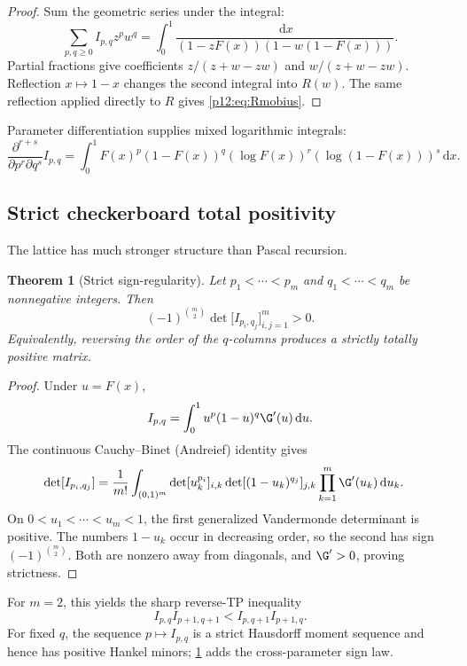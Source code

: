 \documentclass[11pt,oneside]{article}
\newtheorem{theorem}{Theorem}[section]
\theoremstyle{definition}
\theoremstyle{remark}
\newcommand{\F}{F}
\newcommand{\dd}{\,\mathrm d}
\newcommand{\1}{\mathbf 1}
\begin{document}
\begin{proof}
Sum the geometric series under the integral:
\[
 \sum_{p,q\ge0}I_{p,q}z^pw^q
 =\int_0^1\frac{\dd x}
 {(1-z\F(x))(1-w(1-\F(x)))}.
\]
Partial fractions give coefficients
\(z/(z+w-zw)\) and \(w/(z+w-zw)\).  Reflection
\(x\mapsto1-x\) changes the second integral into \(R(w)\).  The same reflection
applied directly to \(R\) gives \eqref{p12:eq:Rmobius}.
\end{proof}

Parameter differentiation supplies mixed logarithmic integrals:
\begin{equation}\label{p12:eq:paramdiff}
 \frac{\partial^{r+s}}{\partial p^r\partial q^s}I_{p,q}
 =\int_0^1\F(x)^p(1-\F(x))^q
 (\log\F(x))^r(\log(1-\F(x)))^s\dd x.
\end{equation}

\subsection{Strict checkerboard total positivity}

The lattice has much stronger structure than Pascal recursion.

\begin{theorem}[Strict sign-regularity\tagnew]\label{p12:thm:signregular}
Let \(p_1<\cdots<p_m\) and \(q_1<\cdots<q_m\) be nonnegative integers.  Then
\begin{equation}\label{p12:eq:signregular}
 (-1)^{\binom m2}
 \det\bigl[I_{p_i,q_j}\bigr]_{i,j=1}^m>0.
\end{equation}
Equivalently, reversing the order of the \(q\)-columns produces a strictly
totally positive matrix.
\end{theorem}

\begin{proof}
Under \(u=\F(x)\),
\[
 I_{p,q}=\int_0^1u^p(1-u)^q\G'(u)\dd u.
\]
The continuous Cauchy--Binet (Andreief) identity gives
\begin{align*}
 \det[I_{p_i,q_j}]
 &=\frac1{m!}\int_{(0,1)^m}
 \det[u_k^{p_i}]_{i,k}
 \det[(1-u_k)^{q_j}]_{j,k}
 \prod_{k=1}^m\G'(u_k)\dd u_k.
\end{align*}
On \(0<u_1<\cdots<u_m<1\), the first generalized Vandermonde determinant is
positive.  The numbers \(1-u_k\) occur in decreasing order, so the second has
sign \((-1)^{\binom m2}\).  Both are nonzero away from diagonals, and
\(\G'>0\), proving strictness.
\end{proof}

For \(m=2\), this yields the sharp reverse-TP inequality
\begin{equation}\label{p12:eq:TP2}
 I_{p,q}I_{p+1,q+1}
 <I_{p,q+1}I_{p+1,q}.
\end{equation}
For fixed \(q\), the sequence \(p\mapsto I_{p,q}\) is a strict Hausdorff moment
sequence and hence has positive Hankel minors; \cref{p12:thm:signregular} adds the
cross-parameter sign law.
\end{document}
